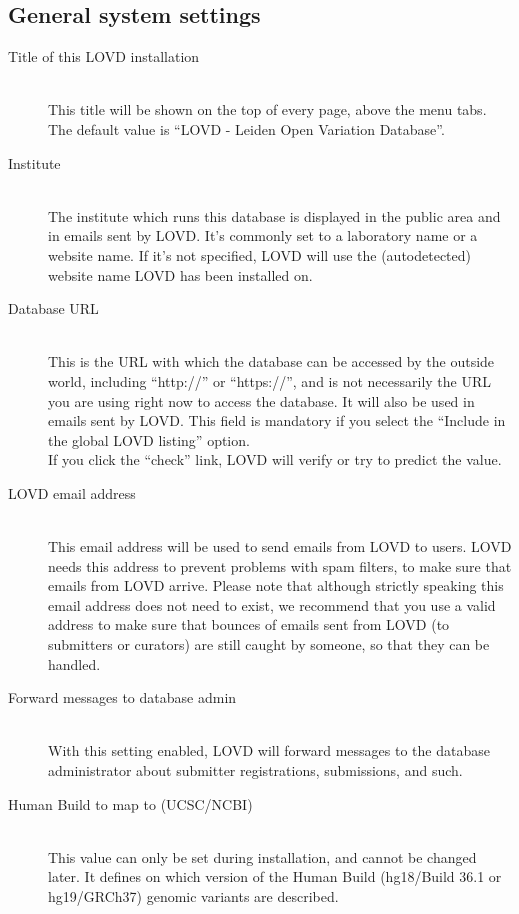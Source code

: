 \documentclass[a4paper,oneside,openany,12pt]{memoir}
\begin{document}
\subsection{General system settings}
\begin{description}
  \item[Title of this LOVD installation] \hfill \\
  This title will be shown on the top of every page, above the menu tabs.
  The default value is ``LOVD - Leiden Open Variation Database''.
  \item[Institute] \hfill \\
  The institute which runs this database is displayed in the public area and in emails sent by LOVD.
  It's commonly set to a laboratory name or a website name.
  If it's not specified, LOVD will use the (autodetected) website name LOVD has been installed on.
  \pagebreak[4] %
  \item[Database URL] \hfill \\
  This is the URL with which the database can be accessed by the outside world, including ``http://'' or ``https://'',
   and is not necessarily the URL you are using right now to access the database.
  It will also be used in emails sent by LOVD.
  This field is mandatory if you select the ``Include in the global LOVD listing'' option.
  \\
  If you click the ``check'' link, LOVD will verify or try to predict the value.
  \item[LOVD email address] \hfill \\
  This email address will be used to send emails from LOVD to users.
  LOVD needs this address to prevent problems with spam filters, to make sure that emails from LOVD arrive.
  Please note that although strictly speaking this email address does not need to exist,
   we recommend that you use a valid address to make sure that bounces of emails sent from LOVD
   (to submitters or curators) are still caught by someone, so that they can be handled.
  \item[Forward messages to database admin] \hfill \\
  With this setting enabled, LOVD will forward messages to the database administrator about submitter registrations, submissions, and such.
  \item[Human Build to map to (UCSC/NCBI)] \hfill \\
  This value can only be set during installation, and cannot be changed later.
  It defines on which version of the Human Build (hg18/Build 36.1 or hg19/GRCh37) genomic variants are described.

\end{description}
\end{document}
